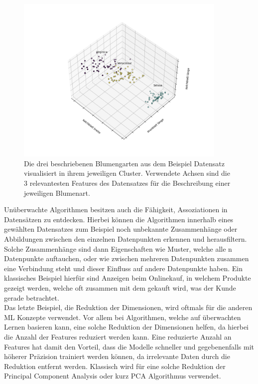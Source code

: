 \documentclass[]{iat}
\begin{document}
\begin{figure}[H]
    \includegraphics[width=0.9\textwidth]{graphics/iris_set_groundtruth.png}
    \centering
    \caption{Die drei beschriebenen Blumengarten aus dem Beispiel Datensatz visualisiert in ihrem jeweiligen Cluster. Verwendete Achsen sind die 3 relevantesten Features des Datensatzes für die Beschreibung einer jeweiligen Blumenart.}
    \label{abb:flower_example}
\end{figure}
Unüberwachte Algorithmen besitzen auch die Fähigkeit, Assoziationen in Datensätzen zu entdecken. Hierbei können die Algorithmen innerhalb eines gewählten Datensatzes zum Beispiel noch unbekannte Zusammenhänge oder Abbildungen zwischen den einzelnen Datenpunkten erkennen und herausfiltern. Solche Zusammenhänge sind dann Eigenschaften wie Muster, welche alle n Datenpunkte auftauchen, oder wie zwischen mehreren Datenpunkten zusammen eine Verbindung steht und dieser Einfluss auf andere Datenpunkte haben. Ein klassisches Beispiel hierfür sind Anzeigen beim Onlinekauf, in welchem Produkte gezeigt werden, welche oft zusammen mit dem gekauft wird, was der Kunde gerade betrachtet.\\
Das letzte Beispiel, die Reduktion der Dimensionen, wird oftmals für die anderen ML Konzepte verwendet. Vor allem bei Algorithmen, welche auf überwachten Lernen basieren kann, eine solche Reduktion der Dimensionen helfen, da hierbei die Anzahl der Features reduziert werden kann. Eine reduzierte Anzahl an Features hat damit den Vorteil, dass die Modelle schneller und gegebenenfalls mit höherer Präzision trainiert werden können, da irrelevante Daten durch die Reduktion entfernt werden. Klassisch wird für eine solche Reduktion der Principal Component Analysis oder kurz PCA Algorithmus verwendet. \cite[]{murphy2012machine} \cite[]{FrocMasc2021}
\end{document}
